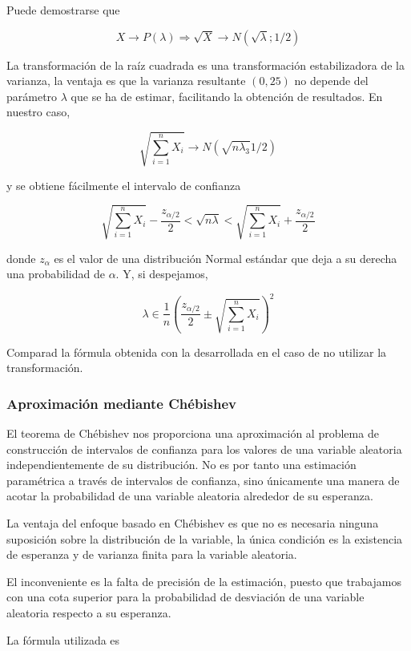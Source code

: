 \documentclass[
]{article}
\begin{document}
Puede demostrarse que

\[
X \rightarrow P(\lambda) \Rightarrow \sqrt{X} \rightarrow N(\sqrt{\lambda} ; 1 / 2)
\]

La transformación de la raíz cuadrada es una transformación estabilizadora de la varianza, la ventaja es que la varianza resultante \((0,25)\) no depende del parámetro \(\lambda\) que se ha de estimar, facilitando la obtención de resultados. En nuestro caso,

\[
\sqrt{\sum_{i=1}^{n} X_{i}} \rightarrow N\left(\sqrt{n \lambda_{3}} 1 / 2\right)
\]

y se obtiene fácilmente el intervalo de confianza

\[
\sqrt{\sum_{i=1}^{n} X_{i}}-\frac{z_{\alpha / 2}}{2}<\sqrt{n \lambda}<\sqrt{\sum_{i=1}^{n} X_{i}}+\frac{z_{\alpha / 2}}{2}
\]

donde \(z_{\alpha}\) es el valor de una distribución Normal estándar que deja a su derecha una probabilidad de \(\alpha\).
Y, si despejamos,

\[
\lambda \in \frac{1}{n}\left(\frac{z_{\alpha / 2}}{2} \pm \sqrt{\sum_{i=1}^{n} X_{i}}\right)^{2}
\]

Comparad la fórmula obtenida con la desarrollada en el caso de no utilizar la transformación.

\subsubsection{Aproximación mediante Chébishev}\label{aproximaciuxf3n-mediante-chuxe9bishev}

El teorema de Chébishev nos proporciona una aproximación al problema de construcción de intervalos de confianza para los valores de una variable aleatoria independientemente de su distribución. No es por tanto una estimación paramétrica a través de intervalos de confianza, sino únicamente una manera de acotar la probabilidad de una variable aleatoria alrededor de su esperanza.

La ventaja del enfoque basado en Chébishev es que no es necesaria ninguna suposición sobre la distribución de la variable, la única condición es la existencia de esperanza y de varianza finita para la variable aleatoria.

El inconveniente es la falta de precisión de la estimación, puesto que trabajamos con una cota superior para la probabilidad de desviación de una variable aleatoria respecto a su esperanza.

La fórmula utilizada es
\end{document}
